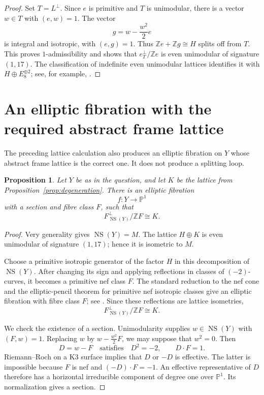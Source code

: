 \documentclass[11pt]{article}
\newcommand{\Z}{\mathbb Z}
\newcommand{\NS}{\operatorname{NS}}
\newtheorem{proposition}[lemma]{Proposition}
\theoremstyle{remark}
\begin{document}
\begin{proof}
Set \(T=L^\perp\).
Since \(e\) is primitive and \(T\) is unimodular, there is a vector
\(w\in T\) with \((e,w)=1\).
The vector
\[
 g=w-\frac{w^2}{2}e
\]
is integral and isotropic, with \((e,g)=1\).
Thus \(\Z e+\Z g\cong H\) splits off from \(T\).
This proves \(1\)-admissibility and shows that
\(e^\perp_T/\Z e\) is even unimodular of signature \((1,17)\).
The classification of indefinite even unimodular lattices identifies
it with \(H\oplus E_8^{\oplus2}\); see, for example,
\cite[Section~1.14]{Nik80}.
\end{proof}

\section{An elliptic fibration with the required abstract frame lattice}

The preceding lattice calculation also produces an elliptic fibration
on \(Y\) whose abstract frame lattice is the correct one.
It does not produce a splitting loop.

\begin{proposition}\label{prop:fibration}
Let \(Y\) be as in the question, and let \(K\) be the lattice from
Proposition~\ref{prop:degeneration}.
There is an elliptic fibration
\[
 f:Y\longrightarrow\mathbb P^1
\]
with a section and fibre class \(F\), such that
\[
 F^\perp_{\NS(Y)}/\Z F\cong K.
\]
\end{proposition}

\begin{proof}
Very generality gives \(\NS(Y)=M\).
The lattice \(H\oplus K\) is even unimodular of signature \((1,17)\);
hence it is isometric to \(M\).

Choose a primitive isotropic generator of the factor \(H\) in this
decomposition of \(\NS(Y)\).
After changing its sign and applying reflections in classes of
\((-2)\)-curves, it becomes a primitive nef class \(F\).
The standard reduction to the nef cone and the elliptic-pencil
theorem for primitive nef isotropic classes give an elliptic
fibration with fibre class \(F\); see
\cite[Chapter~8, Section~2, and Chapter~11, Section~1]{Huy16}.
Since these reflections are lattice isometries,
\[
 F^\perp_{\NS(Y)}/\Z F\cong K.
\]

We check the existence of a section.
Unimodularity supplies \(w\in\NS(Y)\) with \((F,w)=1\).
Replacing \(w\) by \(w-\frac{w^2}{2}F\), we may suppose that \(w^2=0\).
Then
\[
 D=w-F
 \quad\text{satisfies}\quad
 D^2=-2,\qquad D\cdot F=1.
\]
Riemann--Roch on a K3 surface implies that \(D\) or \(-D\) is effective.
The latter is impossible because \(F\) is nef and
\((-D)\cdot F=-1\).
An effective representative of \(D\) therefore has a horizontal
irreducible component of degree one over \(\mathbb P^1\).
Its normalization gives a section.
\end{proof}
\end{document}
